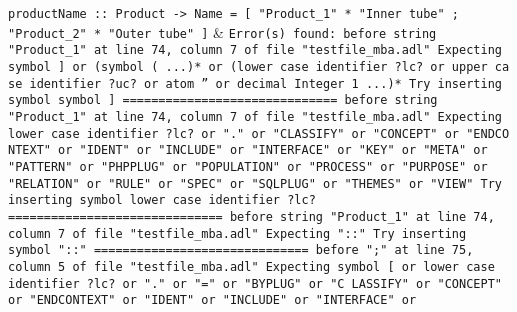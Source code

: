 \texttt{productName :: Product -> Name\newline
    = [ "Product\_1" * "Inner tube"\newline
      ; "Product\_2" * "Outer tube"\newline
      ]} & \texttt{Error(s) found:\newline
  \newline
  before string "Product\_1" at line 74, column 7 of file "testfile\_mba.adl"\newline
  Expecting symbol ] or (symbol ( ...)* or (lower case identifier ?lc? or upper ca\newline
  se identifier ?uc? or atom '' or decimal Integer 1 ...)*\newline
  Try inserting symbol symbol ]\newline
  \newline
  ==============================\newline
  \newline
  before string "Product\_1" at line 74, column 7 of file "testfile\_mba.adl"\newline
  Expecting lower case identifier ?lc? or "." or "CLASSIFY" or "CONCEPT" or "ENDCO\newline
  NTEXT" or "IDENT" or "INCLUDE" or "INTERFACE" or "KEY" or "META" or "PATTERN" or\newline
   "PHPPLUG" or "POPULATION" or "PROCESS" or "PURPOSE" or "RELATION" or "RULE" or\newline
  "SPEC" or "SQLPLUG" or "THEMES" or "VIEW"\newline
  Try inserting symbol lower case identifier ?lc?\newline
  \newline
  ==============================\newline
  \newline
  before string "Product\_1" at line 74, column 7 of file "testfile\_mba.adl"\newline
  Expecting "::"\newline
  Try inserting symbol "::"\newline
  \newline
  ==============================\newline
  \newline
  before ";" at line 75, column 5 of file "testfile\_mba.adl"\newline
  Expecting symbol [ or lower case identifier ?lc? or "." or "=" or "BYPLUG" or "C\newline
  LASSIFY" or "CONCEPT" or "ENDCONTEXT" or "IDENT" or "INCLUDE" or "INTERFACE" or\newline
}
